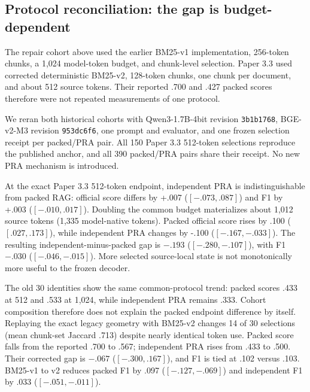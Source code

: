 \documentclass[11pt]{article}
\begin{document}
\subsection{Protocol reconciliation: the gap is budget-dependent}

The repair cohort above used the earlier BM25-v1 implementation, 256-token
chunks, a 1,024 model-token budget, and chunk-level selection. Paper 3.3 used
corrected deterministic BM25-v2, 128-token chunks, one chunk per document, and
about 512 source tokens. Their reported .700 and .427 packed scores therefore
were not repeated measurements of one protocol.

We reran both historical cohorts with Qwen3-1.7B-4bit revision
\texttt{3b1b1768}, BGE-v2-M3 revision \texttt{953dc6f6}, one prompt and
evaluator, and one frozen selection receipt per packed/PRA pair. All 150
Paper 3.3 512-token selections reproduce the published anchor, and all 390
packed/PRA pairs share their receipt. No new PRA mechanism is introduced.

\begin{table}[t]
\centering
\caption{Protocol-locked reconciliation. $\Delta$ is independent PRA minus
packed RAG; intervals are paired 10,000-sample bootstrap intervals. The legacy
row budgets model-native tokens; the other rows budget source whitespace
tokens.}
\label{tab:protocol-reconciliation}
\small
\resizebox{\linewidth}{!}{}
\end{table}

At the exact Paper 3.3 512-token endpoint, independent PRA is indistinguishable
from packed RAG: official score differs by +.007
($[-.073,.087]$) and F1 by +.003 ($[-.010,.017]$). Doubling the common budget
materializes about 1,012 source tokens (1,335 model-native tokens). Packed
official score rises by .100 ($[.027,.173]$), while independent PRA changes by
-.100 ($[-.167,-.033]$). The resulting independent-minus-packed gap is $-.193$
($[-.280,-.107]$), with F1 $-.030$ ($[-.046,-.015]$). More selected
source-local state is not monotonically more useful to the frozen decoder.

The old 30 identities show the same common-protocol trend: packed scores .433
at 512 and .533 at 1,024, while independent PRA remains .333. Cohort
composition therefore does not explain the packed endpoint difference by
itself. Replaying the exact legacy geometry with BM25-v2 changes 14 of 30
selections (mean chunk-set Jaccard .713) despite nearly identical token use.
Packed score falls from the reported .700 to .567; independent PRA rises from
.433 to .500. Their corrected gap is $-.067$ ($[-.300,.167]$), and F1 is tied
at .102 versus .103. BM25-v1 to v2 reduces packed F1 by .097
($[-.127,-.069]$) and independent F1 by .033 ($[-.051,-.011]$).
\end{document}
